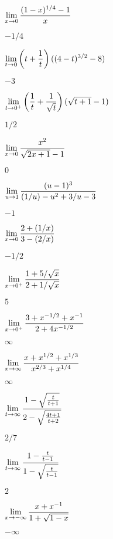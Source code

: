 \begin{exercises}
\exercise $\displaystyle\lim_{x\to0}{(1-x)^{1/4}-1\over x}$
\begin{answer} $-1/4$
\end{answer}

\exercise $\displaystyle\lim_{t\to 0}{\left(t+{1\over t}\right)((4-t)^{3/2}-8)}$
\begin{answer} $-3$
\end{answer}

\exercise $\displaystyle\lim_{t\to 0^+}\left({1\over t}+{1\over\sqrt{t}}\right)
(\sqrt{t+1}-1)$
\begin{answer} $1/2$
\end{answer}

\exercise $\displaystyle\lim_{x\to 0}{x^2\over\sqrt{2x+1}-1}$
\begin{answer} $0$
\end{answer}

\exercise $\displaystyle\lim_{u\to 1}{(u-1)^3\over (1/u)-u^2+3/u-3}$
\begin{answer} $-1$
\end{answer}

\exercise $\displaystyle\lim_{x\to 0}{2+(1/x)\over 3-(2/x)}$
\begin{answer} $-1/2$
\end{answer}

\exercise $\displaystyle\lim_{x\to 0^+}{1+5/\sqrt{x}\over 2+1/\sqrt{x}}$
\begin{answer} $5$
\end{answer}

\exercise $\displaystyle\lim_{x\to 0^+}{3+x^{-1/2}+x^{-1}\over 2+4x^{-1/2}}$
\begin{answer} $\infty$
\end{answer}

\exercise $\displaystyle\lim_{x\to\infty}{x+x^{1/2}+x^{1/3}\over x^{2/3}+x^{1/4}}$
\begin{answer} $\infty$
\end{answer}

\exercise $\displaystyle\lim_{t\to\infty}
{1-\sqrt{t\over t+1}\over 2-\sqrt{4t+1\over t+2}}$
\begin{answer} $2/7$
\end{answer}

\exercise $\displaystyle\lim_{t\to\infty}{1-{t\over t-1}\over 1-\sqrt{t\over t-1}}$
\begin{answer} $2$
\end{answer}

\exercise $\displaystyle\lim_{x\to-\infty}{x+x^{-1}\over 1+\sqrt{1-x}}$
\begin{answer} $-\infty$
\end{answer}


\end{exercises}
